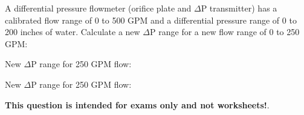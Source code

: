 

A differential pressure flowmeter (orifice plate and $\Delta$P transmitter) has a calibrated flow range of 0 to 500 GPM and a differential pressure range of 0 to 200 inches of water.  Calculate a new $\Delta$P range for a new flow range of 0 to 250 GPM:

\vskip 10pt

New $\Delta$P range for 250 GPM flow: \underbar{\hskip 50pt}







New $\Delta$P range for 250 GPM flow: 







{\bf This question is intended for exams only and not worksheets!}.



